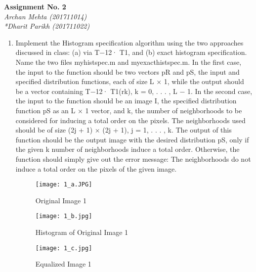 \documentclass[12pt]{report}
\begin{document}
\begin{titlepage}
   \begin{center}
      \Large\textbf{Assignment No. 2}\\
      \large\textit{Archan Mehta (201711014)}
      \large\textit{\\*Dharit Parikh (201711022)}
   \end{center}
\end{titlepage}

\begin{center}
\begin{enumerate}

\item Implement the Histogram specification algorithm using the two approaches discussed
in class: (a) via T−12· T1, and (b) exact histogram specification. Name the two files
myhistspec.m and myexacthistspec.m. In the first case, the input to the function
should be two vectors pR and pS, the input and specified distribution functions, each of
size L × 1, while the output should be a vector containing T−12· T1(rk), k = 0, . . . , L − 1.
In the second case, the input to the function should be an image I, the specified distribution
function pS as an L × 1 vector, and k, the number of neighborhoods to be
considered for inducing a total order on the pixels. The neighborhoods used should
be of size (2j + 1) × (2j + 1), j = 1, . . . , k. The output of this function should be the
output image with the desired distribution pS, only if the given k number of neighborhoods
induce a total order. Otherwise, the function should simply give out the error
message: The neighborhoods do not induce a total order on the pixels of
the given image.

\begin{figure}[h]
\texttt{[image: 1\_a.JPG]}
\caption{Original Image 1}
\end{figure}

\begin{figure}[h]
\texttt{[image: 1\_b.jpg]}
\caption{Histogram of Original Image 1}
\end{figure}


\begin{figure}[h]
\texttt{[image: 1\_c.jpg]}
\caption{Equalized Image 1}
\end{figure}




\end{enumerate}
\end{center}
\end{document}
